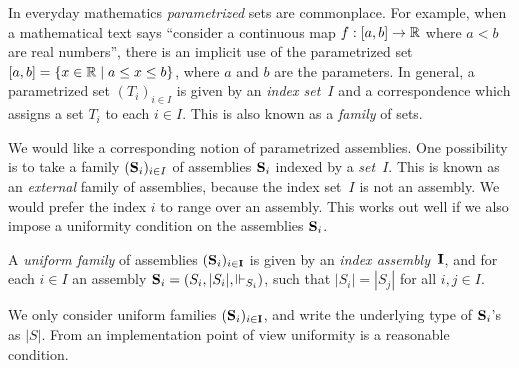 In everyday mathematics \emph{parametrized} sets are commonplace. For
example, when a mathematical text says ``consider a continuous map $f
: [a,b] \to \mathbb{R}$ where $a < b$ are real numbers'', there is an
implicit use of the parametrized set $[a,b] = \{x \in \mathbb{R} \mid a
  \leq x \leq b\}$, where $a$ and $b$ are the parameters. In general, a
parametrized set $(T_i)_{i \in I}$ is given by an \emph{index set~$I$}
and a correspondence which assigns a set $T_i$ to each $i \in I$. This
is also known as a \emph{family} of sets.

We would like a corresponding notion of parametrized assemblies. One
possibility is to take a family $(\mathbf{S}_i)_{i \in I}$ of assemblies
$\mathbf{S}_i$ indexed by a \emph{set}~$I$. This is known as an
\emph{external} family of assemblies, because the index set~$I$ is not
an assembly. We would prefer the index $i$ to range over an assembly.
This works out well if we also impose a uniformity condition on the
assemblies $\mathbf{S}_i$.

\begin{definition}
  A \emph{uniform family} of assemblies $(\mathbf{S}_i)_{i \in \mathbf{I}}$
  is given by an \emph{index assembly~$\mathbf{I}$}, and for each $i \in
  I$ an assembly $\mathbf{S}_i = (S_i, |S_i|, {\Vdash_{S_i}})$, such that $|S_i| = |S_j|$
  for all $i, j \in I$.
\end{definition}

We only consider uniform families $(\mathbf{S}_i)_{i \in \mathbf{I}}$, and
write the underlying type of $\mathbf{S}_i$'s as $|S|$. From an
implementation point of view uniformity is a reasonable condition.

